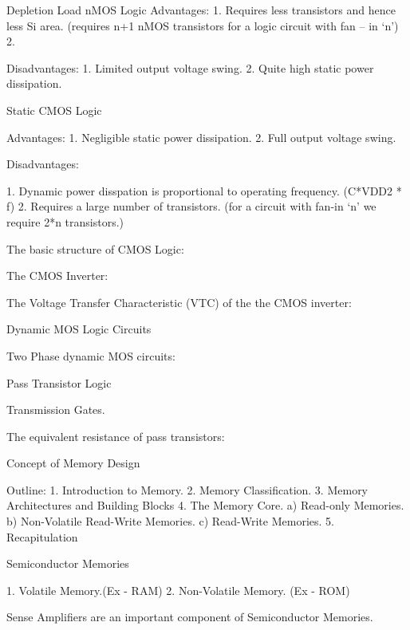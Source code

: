 							Depletion Load nMOS Logic
Advantages:
1. Requires less transistors and hence less Si area. (requires n+1 nMOS transistors for a logic circuit with fan – in ‘n’)
2.


Disadvantages:
1. Limited output voltage swing.
2. Quite high static power dissipation.


							Static CMOS Logic

Advantages:
1. Negligible static power dissipation.
2. Full output voltage swing.

Disadvantages:

1. Dynamic power disspation is proportional to operating frequency. (C*VDD2 * f)
2. Requires a large number of transistors. (for a circuit with fan-in ‘n’ we require 2*n transistors.)


The basic structure of CMOS Logic:



The CMOS Inverter:

The Voltage Transfer Characteristic (VTC) of the the CMOS inverter:





						  Dynamic MOS Logic Circuits

Two Phase dynamic MOS circuits:


 






							







							Pass Transistor Logic


Transmission Gates.


The equivalent resistance of pass transistors:





							Concept of Memory Design

Outline:
1. Introduction to Memory.
2. Memory Classification.
3. Memory Architectures and Building Blocks
4. The Memory Core.
a)	Read-only Memories.
b)	Non-Volatile Read-Write Memories.
c) 	Read-Write Memories.
5. Recapitulation


Semiconductor Memories

1. Volatile Memory.(Ex - RAM)
2. Non-Volatile Memory. (Ex - ROM)

Sense Amplifiers are an important component of Semiconductor Memories.

